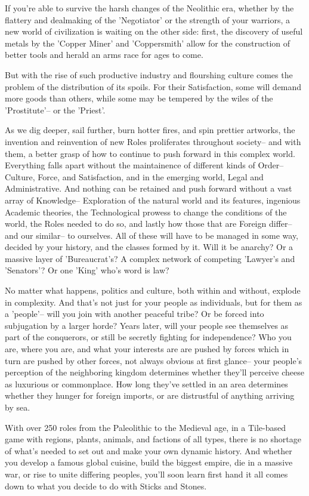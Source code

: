 \documentclass[11pt]{article}
\begin{document}
If you're able to survive the harsh changes of the Neolithic era, whether by the flattery and dealmaking of the 'Negotiator' or the strength of your warriors, a new world of civilization is waiting on the other side: first, the discovery of useful metals by the 'Copper Miner' and 'Coppersmith' allow for the construction of better tools and herald an arms race for ages to come. 

But with the rise of such productive industry and flourshing culture comes the problem of the distribution of its spoils. For their Satisfaction, some will demand more goods than others, while some may be tempered by the wiles of the 'Prostitute'-- or the 'Priest'.

As we dig deeper, sail further, burn hotter fires, and spin prettier artworks, the invention and reinvention of new Roles proliferates throughout society-- and with them, a better grasp of how to continue to push forward in this complex world. Everything falls apart without the maintainence of different kinds of Order-- Culture, Force, and Satisfaction, and in the emerging world, Legal and Administrative. And nothing can be retained and push forward without a vast array of Knowledge-- Exploration of the natural world and its features, ingenious Academic theories, the Technological prowess to change the conditions of the world, the Roles needed to do so, and lastly how those that are Foreign differ-- and our similar-- to ourselves. All of these will have to be managed in some way, decided by your history, and the classes formed by it. Will it be anarchy? Or a massive layer of 'Bureaucrat's? A complex network of competing 'Lawyer's and 'Senators'?  Or one 'King' who's word is law?

No matter what happens, politics and culture, both within and without, explode in complexity. And that's not just for your people as individuals, but for them as a 'people'-- will you join with another peaceful tribe? Or be forced into subjugation by a larger horde? Years later, will your people see themselves as part of the conquerors, or still be secretly fighting for independence? Who you are, where you are, and what your interests are are pushed by forces which in turn are pushed by other forces, not always obvious at first glance-- your people's perception of the neighboring kingdom determines whether they'll perceive cheese as luxurious or commonplace. How long they've settled in an area determines whether they hunger for foreign imports, or are distrustful of anything arriving by sea.  

With over 250 roles from the Paleolithic to the Medieval age, in a Tile-based game with regions, plants, animals, and factions of all types, there is no shortage of what's needed to set out and make your own dynamic history. And whether you develop a famous global cuisine, build the biggest empire, die in a massive war, or rise to unite differing peoples, you'll soon learn first hand it all comes down to what you decide to do with Sticks and Stones. 
\end{document}
